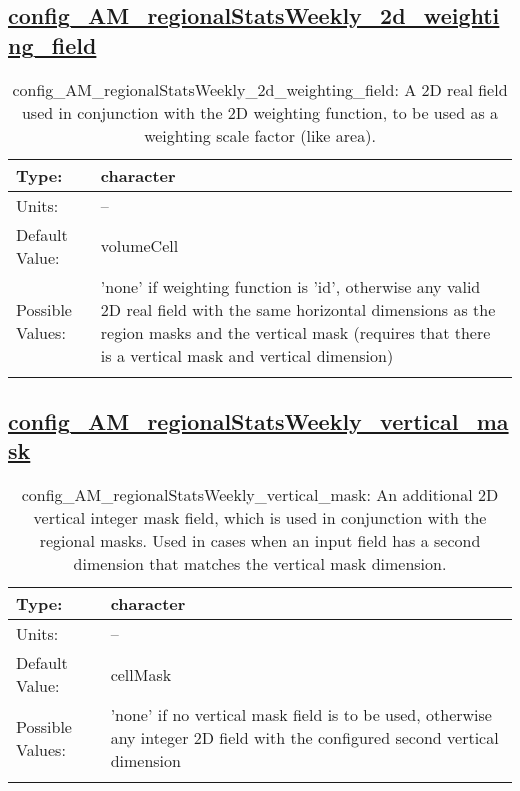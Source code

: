 \subsection[config\_AM\_regionalStatsWeekly\_2d\_weighting\_field]{\hyperref[sec:nm_tab_AM_regionalStatsWeekly]{config\_AM\_regionalStatsWeekly\_2d\_weighting\_field}}
\label{subsec:nm_sec_config_AM_regionalStatsWeekly_2d_weighting_field}
\begin{center}
\begin{longtable}{| p{2.0in} || p{4.0in} |}
    \hline
    Type: & character \\
    \hline
    Units: & -- \\
    \hline
    Default Value: & volumeCell \\
    \hline
    Possible Values: & 'none' if weighting function is 'id', otherwise any valid 2D real field with the same horizontal dimensions as the region masks and the vertical mask (requires that there is a vertical mask and vertical dimension) \\
    \hline
    \caption{config\_AM\_regionalStatsWeekly\_2d\_weighting\_field: A 2D real field used in conjunction with the 2D weighting function, to be used as a weighting scale factor (like area).}
\end{longtable}
\end{center}
\subsection[config\_AM\_regionalStatsWeekly\_vertical\_mask]{\hyperref[sec:nm_tab_AM_regionalStatsWeekly]{config\_AM\_regionalStatsWeekly\_vertical\_mask}}
\label{subsec:nm_sec_config_AM_regionalStatsWeekly_vertical_mask}
\begin{center}
\begin{longtable}{| p{2.0in} || p{4.0in} |}
    \hline
    Type: & character \\
    \hline
    Units: & -- \\
    \hline
    Default Value: & cellMask \\
    \hline
    Possible Values: & 'none' if no vertical mask field is to be used, otherwise any integer 2D field with the configured second vertical dimension \\
    \hline
    \caption{config\_AM\_regionalStatsWeekly\_vertical\_mask: An additional 2D vertical integer mask field, which is used in conjunction with the regional masks. Used in cases when an input field has a second dimension that matches the vertical mask dimension.}
\end{longtable}
\end{center}
